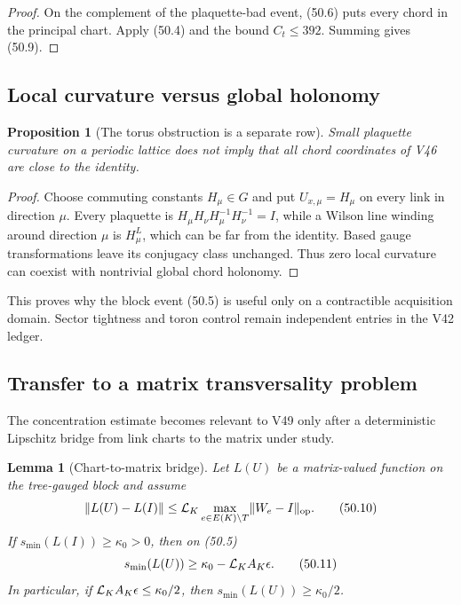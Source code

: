 \documentclass[11pt]{article}
\newtheorem{lemma}[theorem]{Lemma}
\newtheorem{proposition}[theorem]{Proposition}
\begin{document}
\begin{proof}
On the complement of the plaquette-bad event, (50.6) puts every chord
in the principal chart.  Apply (50.4) and the bound
\(C_t\le392\).  Summing gives (50.9).
\end{proof}

\subsection{Local curvature versus global holonomy}

\begin{proposition}[The torus obstruction is a separate row]
\label{prop:v11v50-torus}
Small plaquette curvature on a periodic lattice does not imply that
all chord coordinates of V46 are close to the identity.
\end{proposition}

\begin{proof}
Choose commuting constants \(H_\mu\in G\) and put
\(U_{x,\mu}=H_\mu\) on every link in direction \(\mu\).
Every plaquette is
\(H_\mu H_\nu H_\mu^{-1}H_\nu^{-1}=I\), while a Wilson line winding
around direction \(\mu\) is \(H_\mu^L\), which can be far from the
identity.  Based gauge transformations leave its conjugacy class
unchanged.  Thus zero local curvature can coexist with nontrivial
global chord holonomy.
\end{proof}

This proves why the block event (50.5) is useful only on a
contractible acquisition domain.  Sector tightness and toron control
remain independent entries in the V42 ledger.

\subsection{Transfer to a matrix transversality problem}

The concentration estimate becomes relevant to V49 only after a
deterministic Lipschitz bridge from link charts to the matrix under
study.

\begin{lemma}[Chart-to-matrix bridge]
\label{lem:v11v50-matrix-bridge}
Let \(L(U)\) be a matrix-valued function on the tree-gauged block and
assume
\[
       \lVert L(U)-L(I)\rVert
       \le {\cal L}_K
           \max_{e\in E(K)\setminus T}\lVert W_e-I\rVert_{\rm op}.
                                                                  \tag{50.10}
\]
If \(s_{\min}(L(I))\ge\kappa_0>0\), then on (50.5)
\[
                  s_{\min}(L(U))
                  \ge\kappa_0-{\cal L}_KA_K\epsilon.           \tag{50.11}
\]
In particular, if
\({\cal L}_KA_K\epsilon\le\kappa_0/2\), then
\(s_{\min}(L(U))\ge\kappa_0/2\).
\end{lemma}
\end{document}
